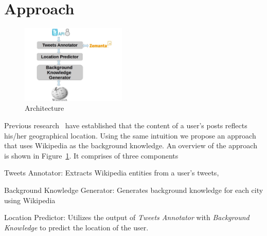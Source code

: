 \section{Approach}
\label{sec:approach}
\begin{figure}
\centering
\includegraphics[width = 5cm]{images/architecture-2.jpg}
\caption{Architecture}
\label{fig:architecture}
\end{figure}
\vspace*{-1.00em}
Previous research~\cite{bo2012geolocation,cheng2010you} have established that the content of a user's posts reflects his/her geographical location. Using the same intuition we propose an approach that uses Wikipedia as the background knowledge. An overview of the approach is shown in Figure~\ref{fig:architecture}. It comprises of three components \begin{inparaenum}[(1)]\item Tweets Annotator: Extracts Wikipedia entities from a user's tweets, \item Background Knowledge Generator: Generates background knowledge for each city using Wikipedia \item Location Predictor: Utilizes the output of \textit{Tweets Annotator} with \textit{Background Knowledge} to predict the location of the user. \end{inparaenum} 

